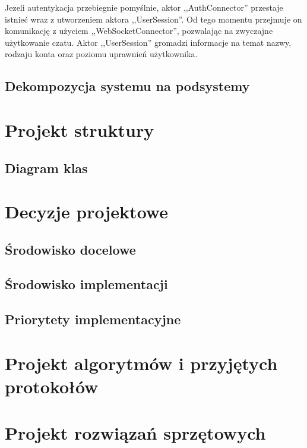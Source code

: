 Jezeli autentykacja przebiegnie pomyślnie, aktor ,,AuthConnector'' przestaje istnieć wraz z utworzeniem aktora ,,UserSession''. Od tego momentu
przejmuje on komunikację z użyciem ,,WebSocketConnector'', pozwalając na zwyczajne użytkowanie czatu. Aktor ,,UserSession'' gromadzi informacje
na temat nazwy, rodzaju konta oraz poziomu uprawnień użytkownika. 

\subsection{Dekompozycja systemu na podsystemy}
\label{architektura_kompilatora}


\section{Projekt struktury}

\subsection{Diagram klas}


\section{Decyzje projektowe}

\subsection{Środowisko docelowe}



\subsection{Środowisko implementacji}


\subsection{Priorytety implementacyjne}


\section{Projekt algorytmów i przyjętych protokołów}

\section{Projekt rozwiązań sprzętowych}



